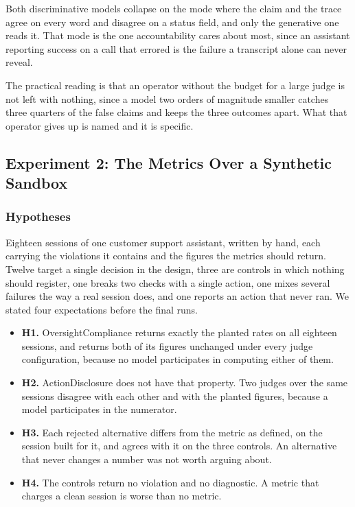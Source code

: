 \documentclass[11pt,a4paper]{article}
\begin{document}
Both discriminative models collapse on the mode where the claim and the trace agree on
every word and disagree on a status field, and only the generative one reads it. That
mode is the one accountability cares about most, since an assistant reporting success
on a call that errored is the failure a transcript alone can never reveal.

The practical reading is that an operator without the budget for a large judge is not
left with nothing, since a model two orders of magnitude smaller catches three quarters
of the false claims and keeps the three outcomes apart. What that operator gives up is
named and it is specific.

\subsection{Experiment 2: The Metrics Over a Synthetic Sandbox}

\subsubsection{Hypotheses}

Eighteen sessions of one customer support assistant, written by hand, each carrying
the violations it contains and the figures the metrics should return. Twelve target a
single decision in the design, three are controls in which nothing should register,
one breaks two checks with a single action, one mixes several failures the way a real
session does, and one reports an action that never ran. We stated four expectations before the final runs.

\begin{itemize}
  \item \textbf{H1.} OversightCompliance returns exactly the planted rates on all
  eighteen sessions, and returns both of its figures unchanged under every judge
  configuration, because no model participates in computing either of them.
  \item \textbf{H2.} ActionDisclosure does not have that property. Two judges over
  the same sessions disagree with each other and with the planted figures, because a
  model participates in the numerator.
  \item \textbf{H3.} Each rejected alternative differs from the metric as defined,
  on the session built for it, and agrees with it on the three controls. An
  alternative that never changes a number was not worth arguing about.
  \item \textbf{H4.} The controls return no violation and no diagnostic. A metric
  that charges a clean session is worse than no metric.
\end{itemize}
\end{document}
